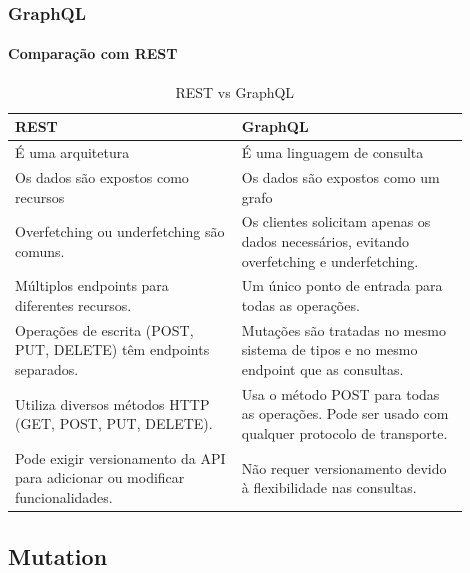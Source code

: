 \documentclass[
	9pt, %
	t, %
]{beamer}
\begin{document}
\begin{frame}
	\frametitle{GraphQL}
	\framesubtitle{Comparação com REST}

	\begin{table}
		\renewcommand{\arraystretch}{1.25} %
		\begin{tabular}{|p{0.45\linewidth}|p{0.45\linewidth}|}
			\hline
			\textbf{REST} & \textbf{GraphQL} \\ \hline
			É uma arquitetura & É uma linguagem de consulta \\ \hline
			Os dados são expostos como recursos & Os dados são expostos como um grafo \\ \hline
			Overfetching ou underfetching são comuns. & Os clientes solicitam apenas os dados necessários, evitando overfetching e underfetching. \\ \hline
			Múltiplos endpoints para diferentes recursos. & Um único ponto de entrada para todas as operações. \\ \hline
			Operações de escrita (POST, PUT, DELETE) têm endpoints separados. & Mutações são tratadas no mesmo sistema de tipos e no mesmo endpoint que as consultas. \\ \hline
			Utiliza diversos métodos HTTP (GET, POST, PUT, DELETE). & Usa o método POST para todas as operações. Pode ser usado com qualquer protocolo de transporte. \\ \hline
			Pode exigir versionamento da API para adicionar ou modificar funcionalidades. & Não requer versionamento devido à flexibilidade nas consultas. \\ \hline
		\end{tabular}
		\caption{REST vs GraphQL}
		\label{tab:rest_graphql}

	\end{table}

\end{frame}

\subsection{Mutation}
\end{document}
